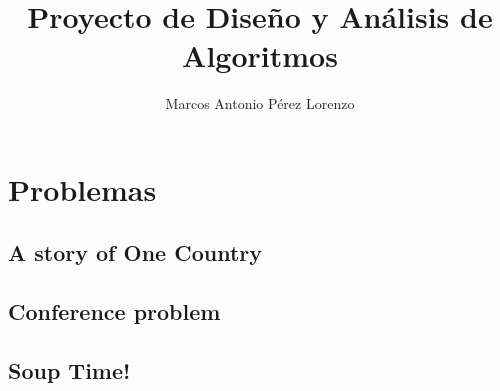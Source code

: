 \documentclass[12pt]{article}
\title{Proyecto de Dise\~no y An\'alisis de Algoritmos}
\author{Marcos Antonio Pérez Lorenzo}
\begin{document}
\maketitle

\section{Problemas}

\subsection{A story of One Country}


\subsection{Conference problem}


\subsection{Soup Time!}

\end{document}
